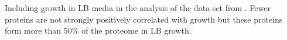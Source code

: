 \label{fig:LB}
Including growth in LB media in the analysis of the data set from \cite{Heinemann2015}.
Fewer proteins are not strongly positively correlated with growth but these proteins form more than $50\%$ of the proteome in LB growth.